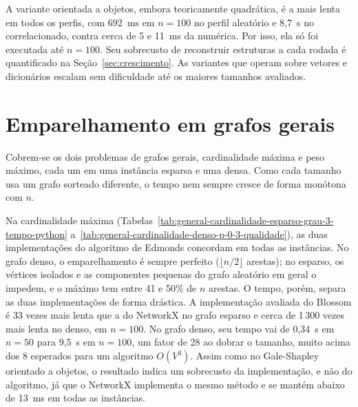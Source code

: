 A variante orientada a objetos, embora teoricamente quadrática, é a mais lenta em
todos os perfis, com 692~ms em $n = 100$ no perfil aleatório e 8{,}7~s no
correlacionado, contra cerca de 5 e 11~ms da numérica. Por isso, ela só foi
executada até $n = 100$. Seu sobrecusto de reconstruir estruturas a cada rodada é
quantificado na Seção~\ref{sec:crescimento}. As variantes que operam sobre vetores
e dicionários escalam sem dificuldade até os maiores tamanhos avaliados.

\section{Emparelhamento em grafos gerais}
\label{sec:res_general}

Cobrem-se os dois problemas de grafos gerais, cardinalidade máxima e peso
máximo, cada um em uma instância esparsa e uma densa. Como cada tamanho usa um
grafo sorteado diferente, o tempo nem sempre cresce de forma monótona com $n$.






Na cardinalidade máxima
(Tabelas~\ref{tab:general-cardinalidade-esparso-grau-3-tempo-python}
a~\ref{tab:general-cardinalidade-denso-p-0-3-qualidade}), as duas implementações
do algoritmo de Edmonds concordam em todas as instâncias. No grafo denso, o
emparelhamento é sempre perfeito ($\lfloor n/2 \rfloor$ arestas); no esparso, os
vértices isolados e as componentes pequenas do grafo aleatório em geral o impedem,
e o máximo tem entre 41 e 50\% de $n$ arestas. O tempo, porém, separa as duas implementações de forma
drástica. A implementação avaliada do Blossom é 33 vezes mais lenta que a do
NetworkX no grafo esparso e cerca de 1\,300 vezes mais lenta no denso, em
$n = 100$. No grafo denso, seu tempo vai de 0{,}34~s em $n = 50$ para 9{,}5~s em
$n = 100$, um fator de 28 ao dobrar o tamanho, muito acima dos 8 esperados para um
algoritmo $O(V^3)$. Assim como no Gale-Shapley orientado a objetos, o resultado
indica um sobrecusto da implementação, e não do algoritmo, já que o NetworkX
implementa o mesmo método e se mantém abaixo de 13~ms em todas as instâncias.






